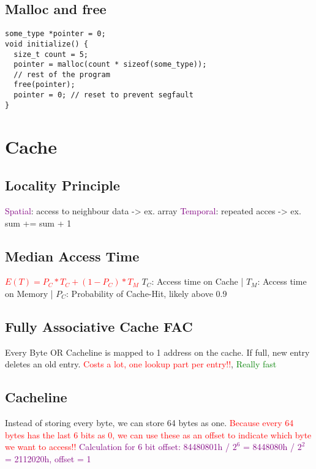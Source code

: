 \documentclass[main.tex,fontsize=8pt,paper=a4,paper=landscape,DIV=calc,]{scrartcl}
\begin{document}
\begin{multicols*}{4}
\subsection{Malloc and free}
\vspace{-2.5mm}
\begin{lstlisting}
some_type *pointer = 0;
void initialize() {
  size_t count = 5;
  pointer = malloc(count * sizeof(some_type));
  // rest of the program 
  free(pointer);
  pointer = 0; // reset to prevent segfault
}
\end{lstlisting}
\vspace{2mm}

\section{Cache}

\subsection{Locality Principle}
\textcolor{purple}{Spatial}: access to neighbour data -> ex. array\newline
\textcolor{purple}{Temporal}: repeated acces -> ex. sum += sum + 1

\subsection{Median Access Time}
\textcolor{red}{\(E(T) = P_C * T_C + (1 - P_C )* T_M\)}\newline
\(T_C\): Access time on Cache |
\(T_M\): Access time on Memory |
\(P_C\): Probability of Cache-Hit, likely above 0.9

\subsection{Fully Associative Cache FAC}
Every Byte OR Cacheline is mapped to 1 address on the cache. If full, new entry deletes an old entry.
\textcolor{red}{Costs a lot, one lookup part per entry!!}, \textcolor{green}{Really fast}

\subsection{Cacheline}
Instead of storing every byte, we can store 64 bytes as one. \textcolor{red}{Because every 64 bytes has the last 6 bits as 0, we can use these as an offset to indicate which byte we want to access!!}
\textcolor{purple}{Calculation for 6 bit offset: 84480801h / \(2^6\) = 8448080h / \(2^2\) = 2112020h, offset = 1 }


\end{multicols*}
\end{document}
